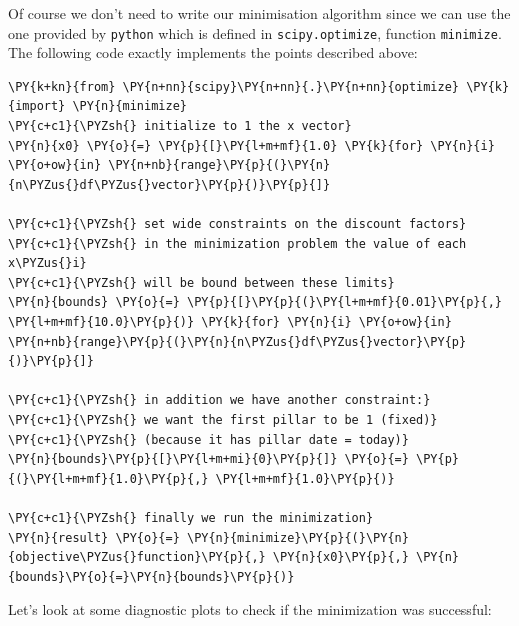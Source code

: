 Of course we don't need to write our minimisation algorithm since we can use the one provided by \texttt{python} which is defined in \texttt{scipy.optimize}, function \texttt{minimize}.
The following code exactly implements the points described above:

\begin{tcolorbox}[breakable, size=fbox, boxrule=1pt, pad at break*=1mm,colback=cellbackground, colframe=cellborder]
\begin{Verbatim}[commandchars=\\\{\}]
\PY{k+kn}{from} \PY{n+nn}{scipy}\PY{n+nn}{.}\PY{n+nn}{optimize} \PY{k}{import} \PY{n}{minimize}   
\PY{c+c1}{\PYZsh{} initialize to 1 the x vector}
\PY{n}{x0} \PY{o}{=} \PY{p}{[}\PY{l+m+mf}{1.0} \PY{k}{for} \PY{n}{i} \PY{o+ow}{in} \PY{n+nb}{range}\PY{p}{(}\PY{n}{n\PYZus{}df\PYZus{}vector}\PY{p}{)}\PY{p}{]} 

\PY{c+c1}{\PYZsh{} set wide constraints on the discount factors}
\PY{c+c1}{\PYZsh{} in the minimization problem the value of each x\PYZus{}i}
\PY{c+c1}{\PYZsh{} will be bound between these limits}
\PY{n}{bounds} \PY{o}{=} \PY{p}{[}\PY{p}{(}\PY{l+m+mf}{0.01}\PY{p}{,} \PY{l+m+mf}{10.0}\PY{p}{)} \PY{k}{for} \PY{n}{i} \PY{o+ow}{in} \PY{n+nb}{range}\PY{p}{(}\PY{n}{n\PYZus{}df\PYZus{}vector}\PY{p}{)}\PY{p}{]} 

\PY{c+c1}{\PYZsh{} in addition we have another constraint:}
\PY{c+c1}{\PYZsh{} we want the first pillar to be 1 (fixed)}
\PY{c+c1}{\PYZsh{} (because it has pillar date = today)}
\PY{n}{bounds}\PY{p}{[}\PY{l+m+mi}{0}\PY{p}{]} \PY{o}{=} \PY{p}{(}\PY{l+m+mf}{1.0}\PY{p}{,} \PY{l+m+mf}{1.0}\PY{p}{)}

\PY{c+c1}{\PYZsh{} finally we run the minimization}
\PY{n}{result} \PY{o}{=} \PY{n}{minimize}\PY{p}{(}\PY{n}{objective\PYZus{}function}\PY{p}{,} \PY{n}{x0}\PY{p}{,} \PY{n}{bounds}\PY{o}{=}\PY{n}{bounds}\PY{p}{)}
\end{Verbatim}
\end{tcolorbox}

Let's look at some diagnostic plots to check if the minimization was successful:

